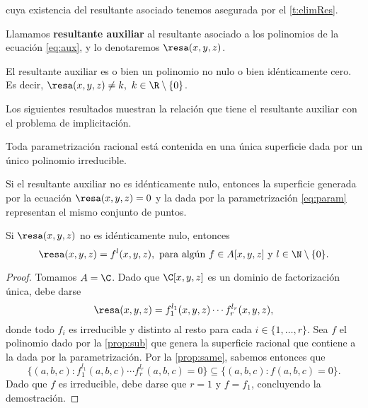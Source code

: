 cuya existencia del resultante asociado tenemos asegurada por el \autoref{t:elimRes}.
\begin{definicion}
    Llamamos \textbf{resultante auxiliar} al resultante asociado a los polinomios de la ecuación \eqref{eq:aux}, y lo denotaremos $\resa(x,y,z)$.
\end{definicion}
\begin{proposicion}
    El resultante auxiliar es o bien un polinomio no nulo o bien idénticamente cero. Es decir, $\resa(x,y,z) \neq k,\ k\in \R\setminus \{0\}$.
\end{proposicion}
Los siguientes resultados muestran la relación que tiene el resultante auxiliar con el problema de implicitación.
\begin{proposicion}\label{prop:sub}
    Toda parametrización racional está contenida en una única superficie dada por un único polinomio irreducible.
\end{proposicion}
\begin{proposicion}\label{prop:same}
    Si el resultante auxiliar  no es idénticamente nulo, entonces la superficie generada por la ecuación $\resa(x,y,z)=0$ y la dada por la parametrización \eqref{eq:param} representan el mismo conjunto de puntos.
\end{proposicion}
\begin{teorema}\label{t:potencia}
    Si $\resa(x,y,z)$ no es idénticamente nulo, entonces
    \begin{equation*}
        \resa(x,y,z) = f^l(x,y,z),\text{ para algún } f\in A[x,y,z] \text{ y } l\in \N\setminus\{0\}.
    \end{equation*}
\end{teorema}
\begin{proof}
    Tomamos $A=\C$. Dado que $\C[x,y,z]$ es un dominio de factorización única, debe darse
    \begin{equation*}
        \resa(x,y,z) = f_1^{l_1}(x,y,z)\cdots f_r^{l_r}(x,y,z),
    \end{equation*}
    donde todo $f_i$ es irreducible y distinto al resto para cada $i\in \{1,\dots, r\}$. Sea $f$ el polinomio dado por la \autoref{prop:sub} que genera la superficie racional que contiene a la dada por la parametrización. Por la \autoref{prop:same}, sabemos entonces que 
    \begin{equation*}
        \{(a,b,c) :  f_1^{l_1}(a,b,c)\cdots f_r^{l_r}(a,b,c) = 0\} \subseteq \{(a,b,c) : f(a,b,c) = 0\}.
    \end{equation*}
    Dado que $f$ es irreducible, debe darse que $r=1$ y $f=f_1$, concluyendo la demostración.
\end{proof}
